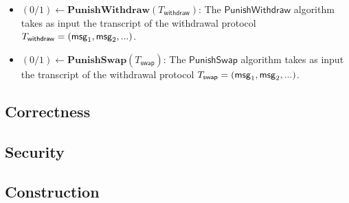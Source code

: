 \begin{definition}
\begin{itemize}[topsep=0pt, itemsep=0pt, leftmargin=2em]
    \item $(0/1) \gets \mathbf{PunishWithdraw}(T_\mathsf{withdraw})$: The $\mathsf{PunishWithdraw}$ algorithm takes as input the transcript of the withdrawal protocol $T_\mathsf{withdraw} = (\mathsf{msg}_1, \mathsf{msg}_2, ...)$. 
    \item $(0/1) \gets \mathbf{PunishSwap}(T_\mathsf{swap})$: The $\mathsf{PunishSwap}$ algorithm takes as input the transcript of the withdrawal protocol $T_\mathsf{swap} = (\mathsf{msg}_1, \mathsf{msg}_2, ...)$.
\end{itemize}
\end{definition}


\subsection{Correctness}
\subsection{Security}
\subsection{Construction}

\newpage
